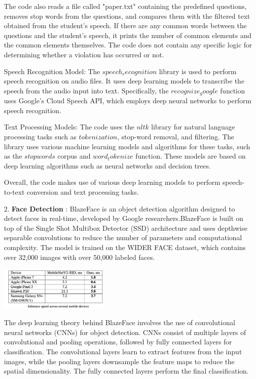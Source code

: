 \documentclass[journal]{IEEEtran}
\begin{document}
The code also reads a file called "paper.txt" containing the predefined questions, removes stop words from the questions, and compares them with the filtered text obtained from the student's speech. If there are any common words between the questions and the student's speech, it prints the number of common elements and the common elements themselves. The code does not contain any specific logic for determining whether a violation has occurred or not.

Speech Recognition Model:
The $speech_recognition$ library is used to perform speech recognition on audio files. It uses deep learning models to transcribe the speech from the audio input into text. Specifically, the $recognize_google$ function uses Google's Cloud Speech API, which employs deep neural networks to perform speech recognition.

Text Processing Models:
The code uses the $nltk$ library for natural language processing tasks such as $tokenization$, stop-word removal, and filtering. The library uses various machine learning models and algorithms for these tasks, such as the $stopwords$ corpus and $word_tokenize$ function. These models are based on deep learning algorithms such as neural networks and decision trees.

Overall, the code makes use of various deep learning models to perform speech-to-text conversion and text processing tasks.



2. \textbf{Face Detection} : BlazeFace is an object detection algorithm designed to detect faces in real-time, developed by Google researchers.BlazeFace is built on top of the Single Shot Multibox Detector (SSD) architecture and uses depthwise separable convolutions to reduce the number of parameters and computational complexity. The model is trained on the WIDER FACE dataset, which contains over 32,000 images with over 50,000 labeled faces.


\includegraphics[width=0.4\textwidth]{blaze.png}

The deep learning theory behind BlazeFace involves the use of convolutional neural networks (CNNs) for object detection. CNNs consist of multiple layers of convolutional and pooling operations, followed by fully connected layers for classification. The convolutional layers learn to extract features from the input images, while the pooling layers downsample the feature maps to reduce the spatial dimensionality. The fully connected layers perform the final classification.
\end{document}
